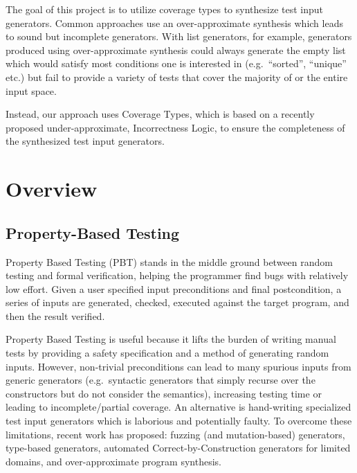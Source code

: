 \documentclass[review, sigplan]{acmart}
\begin{document}
The goal of this project is to utilize coverage types to synthesize test input generators.
Common approaches use an over-approximate synthesis which leads to sound but incomplete generators.
With list generators, for example, generators produced using over-approximate synthesis could always generate the empty list which would satisfy most conditions one is interested in (e.g.~``sorted'', ``unique'' etc.) but fail to provide a variety of tests that cover the majority of or the entire input space.

Instead, our approach uses Coverage Types\citep{Poirot}, which is based on a recently proposed under-approximate, Incorrectness Logic\citep{IL}, to ensure the completeness of the synthesized test input generators.

\section{Overview}

\subsection{Property-Based Testing}

Property Based Testing (PBT) stands in the middle ground between random testing
and formal verification, helping the programmer find bugs with relatively low
effort. Given a user specified input preconditions and final postcondition, a
series of inputs are generated, checked, executed against the target program,
and then the result verified.

Property Based Testing is useful because it lifts the burden of writing manual tests by providing a safety specification and a method of generating random inputs.
However, non-trivial preconditions can lead to many spurious inputs from generic generators (e.g.~syntactic generators that simply recurse over the constructors but do not consider the semantics), increasing testing time or leading to incomplete/partial coverage.
An alternative is hand-writing specialized test input generators which is laborious and potentially faulty.
To overcome these limitations, recent work has proposed: fuzzing (and mutation-based) generators, type-based generators, automated Correct-by-Construction generators for limited domains, and over-approximate program synthesis.
\end{document}
